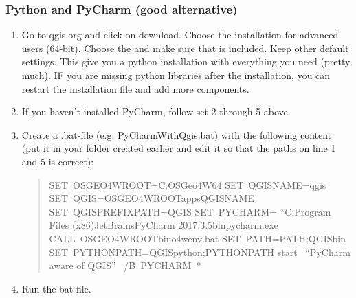 \documentclass[letterpaper,10pt,english]{sphinxmanual}
\begin{document}
\subsubsection{Python and PyCharm (good alternative)}
\label{\detokenize{DevelopmentGuidelines:python-and-pycharm-good-alternative}}\begin{enumerate}
\item {} 
Go to qgis.org and click on download. Choose the installation for
advanced users (64-bit). Choose the 
and make sure that  is included. Keep other default
settings. This give you a python installation with everything you
need (pretty much). IF you are missing python libraries after the
installation, you can restart the installation file and add more
components.

\item {} 
If you haven’t installed PyCharm, follow set 2 through 5 above.

\item {} 
Create a .bat-file (e.g. PyCharmWithQgis.bat) with the following
content (put it in your folder created earlier and edit it so that
the paths on line 1 and 5 is correct):
\begin{quote}

%
\begin{sphinxVerbatim}[commandchars=\\\{\}]
SET OSGEO4W\PYGZus{}ROOT=C:\PYGZbs{}OSGeo4W64
SET QGISNAME=qgis
SET QGIS=\PYGZpc{}OSGEO4W\PYGZus{}ROOT\PYGZpc{}\PYGZbs{}apps\PYGZbs{}\PYGZpc{}QGISNAME\PYGZpc{}
SET QGIS\PYGZus{}PREFIX\PYGZus{}PATH=\PYGZpc{}QGIS\PYGZpc{}
SET PYCHARM= “C:\PYGZbs{}Program   Files   (x86)\PYGZbs{}JetBrains\PYGZbs{}PyCharm   2017.3.5\PYGZbs{}bin\PYGZbs{}pycharm.exe
CALL \PYGZpc{}OSGEO4W\PYGZus{}ROOT\PYGZpc{}\PYGZbs{}bin\PYGZbs{}o4w\PYGZus{}env.bat
SET PATH=\PYGZpc{}PATH\PYGZpc{};\PYGZpc{}QGIS\PYGZpc{}\PYGZbs{}bin
SET PYTHONPATH=\PYGZpc{}QGIS\PYGZpc{}\PYGZbs{}python;\PYGZpc{}PYTHONPATH\PYGZpc{}
start  “PyCharm   aware   of   QGIS”\PYGZbs{}  /B \PYGZpc{}PYCHARM\PYGZpc{} \PYGZpc{}*
\end{sphinxVerbatim}
\end{quote}

\item {} 
Run the bat-file.

\end{enumerate}
\end{document}
